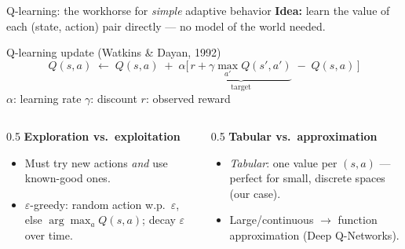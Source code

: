 \documentclass[aspectratio=169,10pt]{beamer}
\begin{document}
\begin{frame}{Q-learning: the workhorse for \emph{simple} adaptive behavior}
  \textbf{Idea:} learn the value of each (state, action) pair directly --- no model of the world needed.
  \vspace{0.4em}
  \begin{block}{Q-learning update (Watkins \& Dayan, 1992)}
    \[
      Q(s,a)\;\leftarrow\;Q(s,a)\;+\;\alpha\Big[\,\underbrace{r+\gamma\max_{a'}Q(s',a')}_{\text{target}}\;-\;Q(s,a)\,\Big]
    \]
    \footnotesize $\alpha$: learning rate \quad $\gamma$: discount \quad $r$: observed reward
  \end{block}
  \vspace{0.2em}
  \begin{columns}[T]
    \begin{column}{0.5\textwidth}
      \textbf{Exploration vs.\ exploitation}
      \begin{itemize}\footnotesize
        \item Must try new actions \emph{and} use known-good ones.
        \item \alert{$\varepsilon$-greedy}: random action w.p.\ $\varepsilon$, else $\arg\max_a Q(s,a)$; decay $\varepsilon$ over time.
      \end{itemize}
    \end{column}
    \begin{column}{0.5\textwidth}
      \textbf{Tabular vs.\ approximation}
      \begin{itemize}\footnotesize
        \item \emph{Tabular}: one value per $(s,a)$ --- perfect for small, discrete spaces (our case).
        \item Large/continuous $\to$ function approximation (Deep Q-Networks).
      \end{itemize}
    \end{column}
  \end{columns}
\end{frame}
\end{document}

